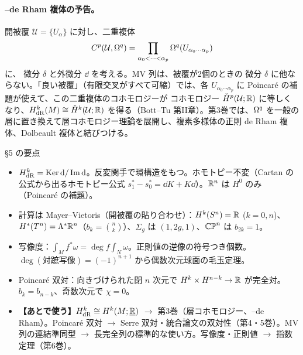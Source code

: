 \paragraph{{\Cech}--de Rham 複体の予告。}開被覆 $\mathcal U=\{U_\alpha\}$ に対し、二重複体
\[
C^{p}(\mathcal U,\Omega^q)=\prod_{\alpha_0<\cdots<\alpha_p}\Omega^q(U_{\alpha_0\cdots\alpha_p})
\]
に、{\Cech} 微分 $\delta$ と外微分 $\dd$ を考える。MV 列は、被覆が2個のときの {\Cech} 微分 $\delta$ に他ならない。「良い被覆」（有限交叉がすべて可縮）では、各 $U_{\alpha_0\cdots\alpha_p}$ に Poincaré の補題が使えて、この二重複体のコホモロジーが {\Cech} コホモロジー $\check H^p(\mathcal U;\mathbb R)$ に等しくなり、$H^k_{\rm dR}(M)\cong\check H^k(\mathcal U;\mathbb R)$ を得る（Bott--Tu 第II章）。第3巻では、$\Omega^q$ を一般の層に置き換えて層コホモロジー理論を展開し、複素多様体の正則 de Rham 複体、Dolbeault 複体と結びつける。

\begin{keybox}{§5 の要点}
\begin{itemize}
\item $H^k_{\rm dR}=\operatorname{Ker}\mathrm{d}/\operatorname{Im}\mathrm{d}$。反変関手で環構造をもつ。ホモトピー不変（Cartan の公式から出るホモトピー公式 $s_1^*-s_0^*=\dd K+K\dd$）。$\mathbb R^n$ は $H^0$ のみ（Poincaré の補題）。
\item 計算は Mayer--Vietoris（開被覆の貼り合わせ）：$H^k(S^n)=\mathbb R$ ($k=0,n$)、$H^*(T^n)=\Lambda^*\mathbb R^n$（$b_k=\binom nk$）、$\Sigma_g$ は $(1,2g,1)$、$\mathbb{CP}^n$ は $b_{2k}=1$。
\item 写像度：$\int_Mf^*\omega=\deg f\int_N\omega$。正則値の逆像の符号つき個数。$\deg(\text{対蹠写像})=(-1)^{n+1}$ から偶数次元球面の毛玉定理。
\item Poincaré 双対：向きづけられた閉 $n$ 次元で $H^k\times H^{n-k}\to\mathbb R$ が完全対。$b_k=b_{n-k}$、奇数次元で $\chi=0$。
\item \textbf{【あとで使う】}$H^k_{\rm dR}\cong H^k(M;\underline{\mathbb R})$ $\to$ 第3巻（層コホモロジー、{\Cech}--de Rham）。Poincaré 双対 $\to$ Serre 双対・統合論文の双対性（第4・5巻）。MV 列の連結準同型 $\to$ 長完全列の標準的な使い方。写像度・正則値 $\to$ 指数定理（第6巻）。
\end{itemize}
\end{keybox}

